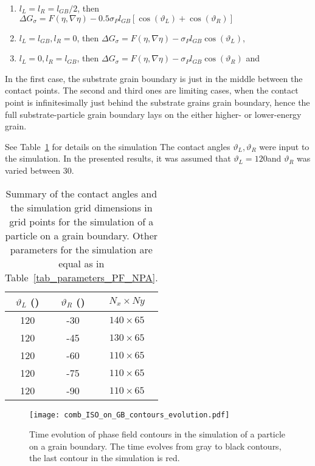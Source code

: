 \begin{enumerate}
	\item $l_L = l_R = l_{GB}/2$, then $\Delta G_\sigma = F(\eta,\nabla\eta)- 0.5\sigma_Pl_{GB}[\cos(\vartheta_L)+\cos(\vartheta_R)]$
	\item $l_L = l_{GB}, l_R = 0$, then $\Delta G_\sigma = F(\eta,\nabla\eta)- \sigma_Pl_{GB}\cos(\vartheta_L)$,
	\item $l_L = 0, l_R = l_{GB}$, then $\Delta G_\sigma = F(\eta,\nabla\eta)- \sigma_Pl_{GB}\cos(\vartheta_R)$ and
\end{enumerate}
In the first case, the substrate grain boundary is just in the middle between the contact points. The second and third ones are limiting cases, when the contact point is infinitesimally just behind the substrate grains grain boundary, hence the full substrate-particle grain boundary lays on the either higher- or lower-energy grain. 


See Table~\ref{tab_ISO_on_GB_angles} for details on the simulation The contact angles $\vartheta_L,\vartheta_R$ were input to the simulation. In the presented results, it was assumed that $\vartheta_L=120$\textdegree and $\vartheta_R$ was varied between 30\textdegree.

\begin{table}
	\centering
	\caption[PF wetting simulation of a particle with isotropic interface energy ona a GB - contact angles and the simulation grid]{Summary of the contact angles and the simulation grid dimensions in grid points for the simulation of a particle on a grain boundary. Other parameters for the simulation are equal as in Table~\ref{tab_parameters_PF_NPA}.}
	\label{tab_ISO_on_GB_angles}
	\begin{tabular}{c|c|c}
		\hline
		$\vartheta_L$ (\textdegree) & $\vartheta_R$ (\textdegree) & $N_x \times Ny$ \\ \hline
		120 & -30 & $140\times65$ \\
		120 & -45 & $130\times65$ \\
		120 & -60 & $110\times65$ \\
		120 & -75 & $110\times65$ \\
		120 & -90 & $110\times65$ 
	\end{tabular}
\end{table}

\begin{figure}
	\centering
	\texttt{[image: comb\_ISO\_on\_GB\_contours\_evolution.pdf]}
	\caption[Time evolution of phase field contours in the simulation of a particle on a grain boundary]{Time evolution of phase field contours in the simulation of a particle on a grain boundary. The time evolves from gray to black contours, the last contour in the simulation is red.}
	\label{fig_PF_nuclbarrier_ISO_onGB_contours}
\end{figure}

